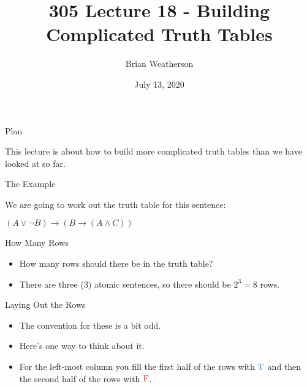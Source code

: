 \documentclass[
  ignorenonframetext,
]{beamer}
\title{305 Lecture 18 - Building Complicated Truth Tables}
\author{Brian Weatherson}
\date{July 13, 2020}
\providecommand{\tightlist}{%
  \setlength{\itemsep}{0pt}\setlength{\parskip}{0pt}}
\renewcommand{\,}{\text{, }}
\renewenvironment*{quote}	
	{\list{}{\rightmargin   \leftmargin} \item } 	
	{\endlist }
\def\True{\textcolor{dodgerblue}{\text{T}}}
\def\False{\textcolor{red}{\text{F}}}
\begin{document}
\frame{\titlepage}

\begin{frame}{Plan}
\protect\hypertarget{plan}{}

This lecture is about how to build more complicated truth tables than we
have looked at so far.

\end{frame}

\begin{frame}{The Example}
\protect\hypertarget{the-example}{}

We are going to work out the truth table for this sentence:

\begin{quote}
\((A \vee \neg B) \rightarrow (B \rightarrow (A \wedge C))\)
\end{quote}

\end{frame}

\begin{frame}{How Many Rows}
\protect\hypertarget{how-many-rows}{}

\begin{itemize}[<+->]
\tightlist
\item
  How many rows should there be in the truth table?
\item
  There are three (3) atomic sentences, so there should be \(2^3 = 8\)
  rows.
\end{itemize}

\end{frame}

\begin{frame}{Laying Out the Rows}
\protect\hypertarget{laying-out-the-rows}{}

\begin{itemize}
\tightlist
\item
  The convention for these is a bit odd.
\item
  Here's one way to think about it.
\item
  For the left-most column you fill the first half of the rows with
  \(\True\) and then the second half of the rows with \(\False\).
\end{itemize}

\end{frame}
\end{document}
